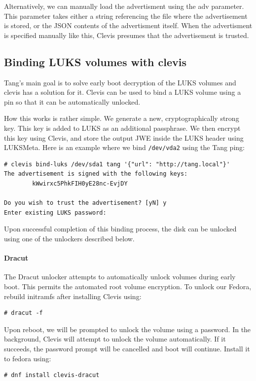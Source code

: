 Alternatively, we can manually load the advertisment using the adv parameter.
This parameter takes either a string referencing the file where the advertisement is stored, or the JSON contents of the advertisment itself.
When the advertisment is specified manually like this, Clevis presumes that the advertisement is trusted.



\subsection{Binding LUKS volumes with clevis}\label{dracut}
Tang's main goal is to solve early boot decryption of the LUKS volumes and clevis has a solution for it.
Clevis can be used to bind a LUKS volume using a pin so that it can be automatically unlocked.

How this works is rather simple. We generate a new, cryptographically strong key.
This key is added to LUKS as an additional passphrase.
We then encrypt this key using Clevis, and store the output JWE inside the LUKS header using LUKSMeta.
Here is an example where we bind {\tt /dev/vda2} using the Tang ping:
\begin{lstlisting}[columns=fixed,basicstyle=\ttfamily\footnotesize,tabsize=4,backgroundcolor=\color{yellow!10}]
# clevis bind-luks /dev/sda1 tang '{"url": "http://tang.local"}'
The advertisement is signed with the following keys:
        kWwirxc5PhkFIH0yE28nc-EvjDY

Do you wish to trust the advertisement? [yN] y
Enter existing LUKS password:
\end{lstlisting}

Upon successful completion of this binding process, the disk can be unlocked using one of the unlockers described below.


\paragraph{Dracut}\label{dracut}
The Dracut unlocker attempts to automatically unlock volumes during early boot.
This permits the automated root volume encryption.
To unlock our Fedora, rebuild initramfs after installing Clevis using: %

\begin{lstlisting}[columns=fixed,basicstyle=\ttfamily\footnotesize,tabsize=4,backgroundcolor=\color{yellow!10}]
# dracut -f
\end{lstlisting}
Upon reboot, we will be prompted to unlock the volume using a password.
In the background, Clevis will attempt to unlock the volume automatically.
If it succeeds, the password prompt will be cancelled and boot will continue.
Install it to fedora using:
\begin{lstlisting}[columns=fixed,basicstyle=\ttfamily\footnotesize,tabsize=4,backgroundcolor=\color{yellow!10}]
# dnf install clevis-dracut
\end{lstlisting}
